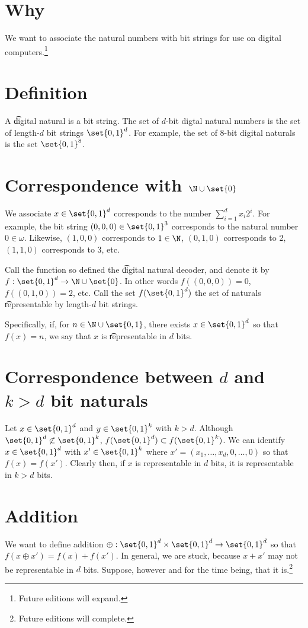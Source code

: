 
\section*{Why}

We want to associate the natural numbers with bit strings for use on digital computers.\footnote{Future editions will expand.}

\section*{Definition}

A \t{digital natural} is a bit string.
The set of \t{$d$-bit digtal natural numbers} is the set of length-$d$ bit strings $\set{0, 1}^d$.
For example, the set of 8-bit digital naturals is the set $\set{0, 1}^8$.

\section*{Correspondence with $\N   \cup \set{0}$}

We associate $x \in \set{0, 1}^d$ corresponds to the number $\sum_{i = 1}^{d} x_i 2^i$.
For example, the bit string $(0,0,0) \in \set{0, 1}^3$ corresponds to the natural number $0 \in \omega $.
Likewise, $(1, 0, 0)$ corresponds to $1 \in \N  $, $(0, 1, 0)$ corresponds to 2, $(1, 1, 0)$ corresponds to 3, etc.

Call the function so defined the \t{digital natural decoder}, and denote it by $f: \set{0, 1}^d \to \N   \cup \set{0}$.
In other words $f((0, 0, 0)) = 0$, $f((0, 1, 0)) = 2$, etc.
Call the set $f(\set{0, 1}^d)$ the set of naturals \t{representable} by length-$d$ bit strings.

Specifically, if, for $n \in \N   \cup \set{0, 1}$, there exists $x \in \set{0, 1}^d$ so that $f(x) = n$, we say that $x$ is \t{representable in $d$ bits}.

\section*{Correspondence between $d$ and $k > d$ bit naturals}

Let $x \in \set{0, 1}^d$ and $y \in \set{0, 1}^k$ with $k > d$.
Although $\set{0, 1}^d \not\subset \set{0, 1}^k$, $f(\set{0, 1}^d) \subset f(\set{0, 1}^k)$.
We can identify $x \in \set{0, 1}^d$ with $x' \in \set{0, 1}^k$ where $x' = (x_1, \dots , x_d, 0, \dots , 0)$ so that $f(x) = f(x')$.
Clearly then, if $x$ is representable in $d$ bits, it is representable in $k > d$ bits.

\section*{Addition}



We want to define addition $\oplus: \set{0, 1}^d \times \set{0, 1}^d \to \set{0, 1}^d$ so that $f(x \oplus x') = f(x) + f(x')$.
In general, we are stuck, because $x + x'$ may not be representable in $d$ bits.
Suppose, however and for the time being, that it is.\footnote{Future editions will complete.}
